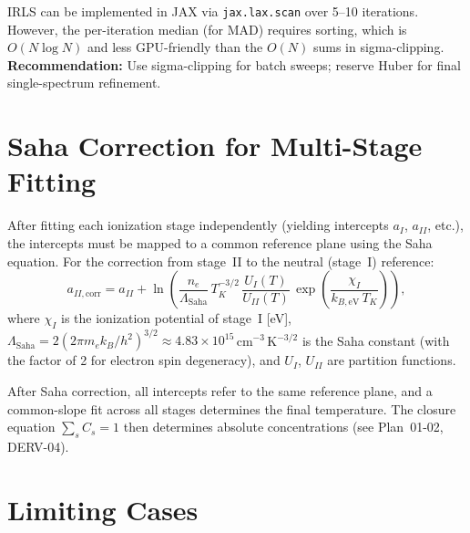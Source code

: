 \documentclass[11pt]{article}
\newcommand{\kbeV}{k_{B,\text{eV}}}
\begin{document}
IRLS can be implemented in JAX via \texttt{jax.lax.scan} over 5--10 iterations.
However, the per-iteration median (for MAD) requires sorting, which is $O(N\log N)$
and less GPU-friendly than the $O(N)$ sums in sigma-clipping.
\textbf{Recommendation:} Use sigma-clipping for batch sweeps; reserve Huber for
final single-spectrum refinement.


\section{Saha Correction for Multi-Stage Fitting}
\label{sec:saha}

After fitting each ionization stage independently (yielding intercepts $a_I$, $a_{II}$,
etc.), the intercepts must be mapped to a common reference plane using the
Saha equation. For the correction from stage~II to the neutral (stage~I) reference:
\begin{equation}
  a_{II,\text{corr}} = a_{II}
    + \ln\!\left(\frac{n_e}{\Lambda_{\text{Saha}}}\,T_K^{-3/2}\,
      \frac{U_I(T)}{U_{II}(T)}\,\exp\!\left(\frac{\chi_I}{\kbeV\,T_K}\right)\right),
  \label{eq:saha_correction}
\end{equation}
where $\chi_I$ is the ionization potential of stage~I [eV],
$\Lambda_{\text{Saha}} = 2(2\pi m_e k_B / h^2)^{3/2} \approx 4.83 \times 10^{15}$\,cm$^{-3}$\,K$^{-3/2}$
is the Saha constant (with the factor of 2 for electron spin degeneracy), and
$U_I$, $U_{II}$ are partition functions.

After Saha correction, all intercepts refer to the same reference plane, and a
common-slope fit across all stages determines the final temperature.
The closure equation $\sum_s C_s = 1$ then determines absolute concentrations
(see Plan~01-02, DERV-04).


\section{Limiting Cases}
\label{sec:limits}
\end{document}
